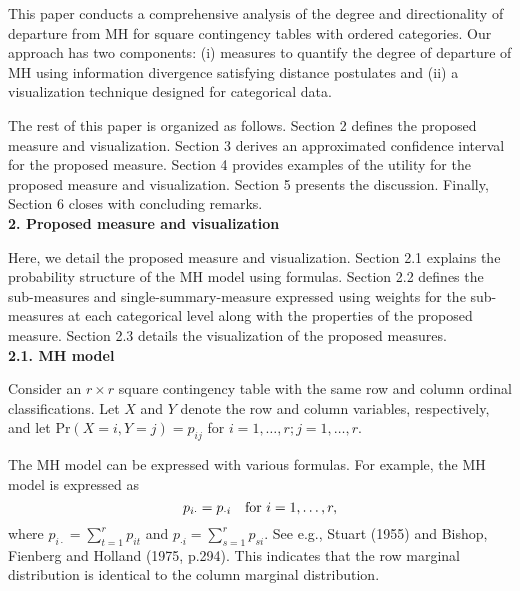 \documentclass[a4j,12pt]{article}
\begin{document}
This paper conducts a comprehensive analysis of the degree and directionality of departure from MH for square contingency tables with ordered categories. 
Our approach has two components: (i) measures to quantify the degree of departure of MH using information divergence satisfying distance postulates and (ii) a visualization technique designed for categorical data.

The rest of this paper is organized as follows. 
Section 2 defines the proposed measure and visualization. 
Section 3 derives an approximated confidence interval for the proposed measure. 
Section 4 provides examples of the utility for the proposed measure and visualization. 
Section 5 presents the discussion. 
Finally, Section 6 closes with concluding remarks.
\\


\noindent \textbf{\large 2. Proposed measure and visualization}

Here, we detail the proposed measure and visualization. 
Section 2.1 explains the probability structure of the MH model using formulas. 
Section 2.2 defines the sub-measures and single-summary-measure expressed using weights for the sub-measures at each categorical level along with the properties of the proposed measure. 
Section 2.3 details the visualization of the proposed measures.
\\


\noindent \textbf{\large 2.1. MH model}

Consider an $r \times r$ square contingency table with the same row and column ordinal classifications.
Let $X$ and $Y$ denote the row and column variables, respectively, and let Pr$(X = i , Y = j) = p_{ij}$ for $i = 1, \ldots , r; j = 1, \ldots , r$.

The MH model can be expressed with various formulas.
For example, the MH model is expressed as
\[
p_{i \cdot} = p_{\cdot i} \quad {\rm for} ~ i = 1, \ldots , r,
\]
where $p_{i \cdot} = \sum^r_{t=1}p_{it}$ and $p_{\cdot i} = \sum^r_{s=1}p_{si}$. 
See e.g., Stuart (1955) and Bishop, Fienberg and Holland (1975, p.294).
This indicates that the row marginal distribution is identical to the column marginal distribution.
\end{document}
